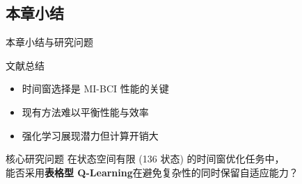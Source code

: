 {%
\subsection{本章小结}

\begin{frame}{本章小结与研究问题}
    \begin{block}{文献总结}
        \begin{itemize}
            \item 时间窗选择是 MI-BCI 性能的关键
            \item 现有方法难以平衡性能与效率
            \item 强化学习展现潜力但计算开销大
        \end{itemize}
    \end{block}

    \vspace{0.2cm}
    \begin{exampleblock}{核心研究问题}
        \centering
        在状态空间有限 (136 状态) 的时间窗优化任务中，\\
        能否采用\textbf{表格型 Q-Learning}在避免复杂性的同时保留自适应能力？
    \end{exampleblock}
\end{frame}

} %
